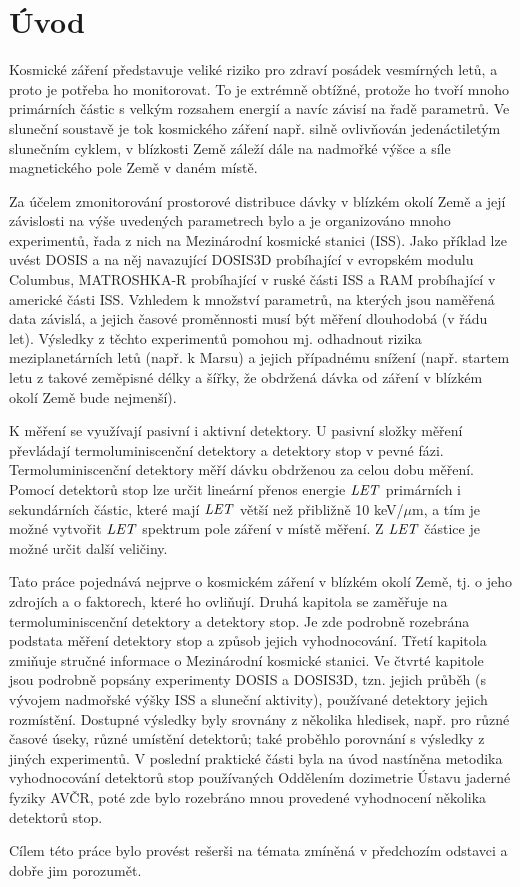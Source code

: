 \chapter*{Úvod}
\markright{}
Kosmické záření představuje veliké riziko pro zdraví posádek vesmírných letů, a proto je potřeba ho monitorovat. To je extrémně obtížné, protože ho tvoří mnoho primárních částic s velkým rozsahem energií a navíc závisí na řadě parametrů. Ve sluneční soustavě je tok kosmického záření např. silně ovlivňován jedenáctiletým slunečním cyklem, v blízkosti Země záleží dále na nadmořké výšce a síle magnetického pole Země v daném místě. 

Za účelem zmonitorování prostorové distribuce dávky v blízkém okolí Země a její závislosti na výše uvedených parametrech bylo a je organizováno mnoho experimentů, řada z nich na Mezinárodní kosmické stanici (ISS). Jako příklad lze uvést DOSIS a na něj navazující DOSIS3D probíhající v evropském modulu Columbus, MATROSHKA-R probíhající v ruské části ISS a RAM probíhající v americké části ISS. Vzhledem k množství parametrů, na kterých jsou naměřená data závislá, a jejich časové proměnnosti musí být měření dlouhodobá (v řádu let). Výsledky z těchto experimentů pomohou mj. odhadnout rizika meziplanetárních letů (např. k Marsu) a jejich případnému snížení (např. startem letu z takové zeměpisné délky a šířky, že obdržená dávka od záření v blízkém okolí Země bude nejmenší). 

K měření se využívají pasivní i aktivní detektory. U pasivní složky měření převládají termoluminiscenční detektory a detektory stop v pevné fázi. Termoluminiscenční detektory měří dávku obdrženou za celou dobu měření. Pomocí detektorů stop lze určit lineární přenos energie $\mathit{LET}$ primárních i sekundárních částic, které mají $\mathit{LET}$ větší než přibližně 10 keV/$\mu$m, a tím je možné vytvořit $\mathit{LET}$ spektrum pole záření v místě měření. Z $\mathit{LET}$ částice je možné určit další veličiny.

Tato práce pojednává nejprve o kosmickém záření v blízkém okolí Země, tj. o jeho zdrojích a o faktorech, které ho ovliňují. Druhá kapitola se zaměřuje na termoluminiscenční detektory a detektory stop. Je zde podrobně rozebrána podstata měření detektory stop a způsob jejich vyhodnocování. Třetí kapitola zmiňuje stručné informace o Mezinárodní kosmické stanici. Ve čtvrté kapitole jsou podrobně popsány experimenty DOSIS a DOSIS3D, tzn. jejich průběh (s vývojem nadmořské výšky ISS a sluneční aktivity), používané detektory jejich rozmístění. Dostupné výsledky byly srovnány z několika hledisek, např. pro různé časové úseky, různé umístění detektorů; také proběhlo porovnání s výsledky
z jiných experimentů. V poslední praktické části byla na úvod nastíněna metodika vyhodnocování detektorů stop používaných Oddělením dozimetrie Ústavu jaderné fyziky AVČR, poté zde bylo rozebráno mnou provedené vyhodnocení několika detektorů stop.

Cílem této práce bylo provést rešerši na témata zmíněná v předchozím odstavci a dobře jim porozumět.
